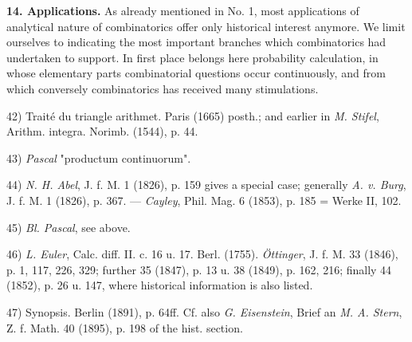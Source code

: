 \vspace{0.1cm}

\textbf{14. Applications.} As already mentioned in No. 1, most applications of analytical nature of combinatorics offer only historical interest anymore. We limit ourselves to indicating the most important branches which combinatorics had undertaken to support. In first place belongs here probability calculation, in whose elementary parts combinatorial questions occur continuously, and from which conversely combinatorics has received many stimulations. 

\vspace{-0.1cm}
\leftline{\rule{2in}{0.4pt}}
\vspace{0.1cm}
{
\footnotesize
42) Traité du triangle arithmet. Paris (1665) posth.; and earlier in \textit{M. Stifel}, Arithm. integra. Norimb. (1544), p. 44.

43) \textit{Pascal} "productum continuorum".

44) \textit{N. H. Abel}, J. f. M. 1 (1826), p. 159 gives a special case; generally \textit{A. v. Burg}, J. f. M. 1 (1826), p. 367. — \textit{Cayley}, Phil. Mag. 6 (1853), p. 185 = Werke II, 102.

45) \textit{Bl. Pascal}, see above.

46) \textit{L. Euler}, Calc. diff. II. c. 16 u. 17. Berl. (1755). \textit{Öttinger}, J. f. M. 33 (1846), p. 1, 117, 226, 329; further 35 (1847), p. 13 u. 38 (1849), p. 162, 216; finally 44 (1852), p. 26 u. 147, where historical information is also listed.

47) Synopsis. Berlin (1891), p. 64ff. Cf. also \textit{G. Eisenstein}, Brief an \textit{M. A. Stern}, Z. f. Math. 40 (1895), p. 198 of the hist. section.

}
